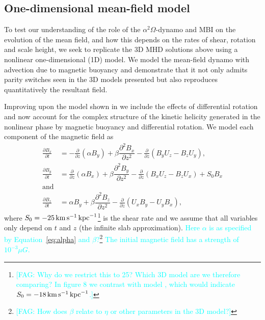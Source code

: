 \documentclass[fleqn,usenatbib]{mnras}
\newcommand{\RSOBSD}{{\sf{O60q0.3}}}
\newcommand{\fg}[1]{\textcolor{cyan}{#1}} %
\newcommand{\fag}[1]{\textcolor{cyan}{[FAG: #1]}} %
\newcommand\deriv[2]{\frac{\partial#1}{\partial#2}}%
\newcommand{\km}{\,{\rm km}}    %
\newcommand{\kpc}{\,{\rm kpc}}  %
\newcommand{\s}{\,{\rm s}}      %
\newcommand{\kms}{\km\s^{-1}}    %
\begin{document}

\subsection{One-dimensional mean-field model}\label{sec:1D}

{To test our understanding of the role of the $\alpha^2\Omega$-dynamo and
MBI on the evolution of the mean field, and how this depends on the rates of
shear, rotation and scale height, we seek to replicate the 3D MHD solutions
above using} a nonlinear one-dimensional {(1D)} model{. We model} the
mean-field dynamo with advection due to magnetic buoyancy and demonstrate that
it not only admits parity switches seen in the {3D} models presented but
also reproduces quantitatively the resultant field.

Improving upon the model shown in \citet{QSTGB23} we include the effects of
differential rotation and now account for the complex structure of the kinetic
helicity generated in the nonlinear phase by magnetic buoyancy and differential
rotation.  {We model each component of the magnetic field as}
\begin{align}
\deriv{B_x}{t} &= -\deriv{}{z}(\alpha B_y)+\beta\dfrac{\partial^2 B_x}{\partial z^2} - \deriv{}{z} (B_yU_z - B_zU_y)\label{1DBx}, \\
\deriv{B_y}{t} &= \deriv{}{z}(\alpha B_x)+\beta\dfrac{\partial^2 B_y}{\partial z^2} - \deriv{}{z} (B_xU_z - B_zU_x) + S_0B_x\label{1DBy} \\
\nonumber
\text{and}& \\
\deriv{B_z}{t} &= \alpha B_y + \beta\dfrac{\partial^2B_z}{\partial z^2} - \deriv{}{z}(U_xB_y-U_yB_x)\label{1DBz},
\end{align}
where $S_0=-25 \kms\kpc^{-1}$\footnote{\fag{Why do we restrict this to 25?
Which 3D model are we therefore comparing? In figure 8 we contrast with model
\RSOBSD, which would indicate $S_0=-18 \kms\kpc^{-1}$.}} is the shear rate and
we assume that all variables only depend on $t$ and $z$ (the infinite slab
approximation).  \fg{Here $\alpha$ is as specified by Equation~\eqref{eq:alpha}
and $\beta$?\footnote{\fag{How does $\beta$ relate to $\eta$ or other
parameters in the 3D model?}} The initial magnetic field has a strength of
$10^{-3} \mu G$.}
\end{document}
